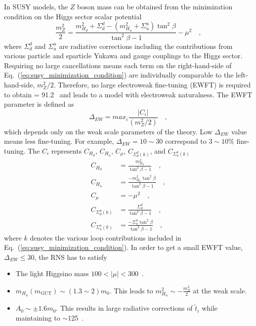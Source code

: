 In SUSY models, the $Z$ boson mass can be obtained from the minimization condition on the Higgs sector scalar potential
%
\begin{equation}
    \frac{m_{Z}^{2}}{2} = \frac{m^{2}_{H_{d}} + \Sigma^{d}_{d} - (m^{2}_{H_{u}} + \Sigma^{u}_{u})\tan^{2}\beta}{\tan^{2}\beta - 1} - \mu^{2} \quad ,
    \label{eq:susy_minimization_condition}
\end{equation}
%
where $\Sigma^{d}_{d}$ and $\Sigma^{u}_{u}$ are radiative corrections including the contributions from various particle and sparticle Yukawa and gauge couplings to the Higgs sector.
Requiring no large cancellations means each term on the right-hand-side of Eq.~(\ref{eq:susy_minimization_condition}) are individually comparable to the left-hand-side, $m_{Z}^{2}/2$.
Therefore, no large electroweak fine-tuning (EWFT) is required to obtain \mZ = 91.2~{\GeV} and leads to a model with electroweak naturalness.
The EWFT parameter is defined as
%
\begin{equation}
    \Delta_{EW} =  max_{i} \frac{|C_{i}|}{(m_{Z}^{2}/2)} \quad ,
    \label{eq:susy_ewft}
\end{equation}
%
which depends only on the weak scale parameters of the theory.
Low $\Delta_{EW}$ value means less fine-tuning.
For example, $\Delta_{EW} = 10 \sim 30$ correspond to $3 \sim 10 \%$ fine-tuning.
The $C_{i}$ represents $C_{H_{d}}$, $C_{H_{u}}$, $C_{\mu}$, $C_{\Sigma^{d}_{d}(k)}$, and $C_{\Sigma^{u}_{u}(k)}$
%
\begin{align}
    C_{H_{d}} &= \frac{m^{2}_{H_{d}}}{\tan^{2}\beta - 1} \quad ,\\
    C_{H_{u}} &= \frac{-m^{2}_{H_{u}}\tan^{2}\beta}{\tan^{2}\beta - 1} \quad ,\\
    C_{\mu} &= -\mu^{2} \quad ,\\
    C_{\Sigma^{d}_{d}(k)} &= \frac{\Sigma^{d}_{d}}{\tan^{2}\beta - 1} \quad ,\\
    C_{\Sigma^{u}_{u}(k)} &= \frac{-\Sigma^{u}_{u}\tan^{2}\beta}{\tan^{2}\beta - 1} \quad ,
    \label{eq:susy_ci}
\end{align}
% 
where $k$ denotes the various loop contributions included in Eq.~(\ref{eq:susy_minimization_condition}).
In order to get a small EWFT value, $\Delta_{EW} \leq 30$, the RNS has to satisfy
%
\begin{itemize}
    \item The light Higgsino mass $100 < |\mu| < 300$~{\GeV}. 
    \item $m_{H_{u}}(m_{\text{GUT}}) \sim (1.3 \sim 2) m_{0}$. This leads to $m^{2}_{H_{u}} \sim - \frac{m^{2}_{Z}}{2}$ at the weak scale.
    \item $A_{0} \sim \pm 1.6 m_{0}$. This results in large radiative corrections of $\widetilde{t}_{i}$ while maintaining \mH to $\sim$125~{\GeV}.
\end{itemize}
